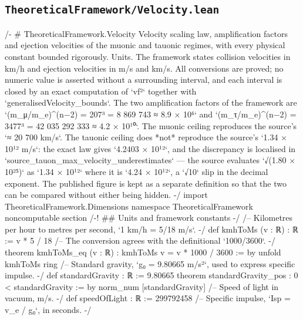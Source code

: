 \documentclass[11pt,a4paper]{article}
\begin{document}
\clearpage


\subsection*{\texttt{TheoreticalFramework/Velocity.lean}}
\vspace{2pt}
{\ttfamily\scriptsize\setlength{\parindent}{0pt}\setlength{\baselineskip}{7.6pt}\setlength{\parskip}{0pt}\raggedright\obeyspaces\obeylines
/-
\# TheoreticalFramework.Velocity
\mbox{}
Velocity scaling law, amplification factors and ejection velocities of the
muonic and tauonic regimes, with every physical constant bounded rigorously.
\mbox{}
Units.  The framework states collision velocities in km/h and ejection
velocities in m/s and km/s.  All conversions are proved; no numeric value is
asserted without a surrounding interval, and each interval is closed by an exact
computation of `vf²` together with `generalisedVelocity\_\allowbreak{}bounds`.
\mbox{}
The two amplification factors of the framework are
`(m\_\allowbreak{}μ/m\_\allowbreak{}e)\textasciicircum{}(n−2) = 207³ = 8 869 743 ≈ 8.9 × 10⁶` and
`(m\_\allowbreak{}τ/m\_\allowbreak{}e)\textasciicircum{}(n−2) = 3477³ = 42 035 292 333 ≈ 4.2 × 10¹⁰`.
\mbox{}
The muonic ceiling reproduces the source's `≈ 20 700 km/s`.  The tauonic ceiling
does *not* reproduce the source's `1.34 × 10¹² m/s`: the exact law gives
`4.2403 × 10¹²`, and the discrepancy is localised in
`source\_\allowbreak{}tauon\_\allowbreak{}max\_\allowbreak{}velocity\_\allowbreak{}underestimates` — the source evaluates
`√(1.80 × 10²⁵)` as `1.34 × 10¹²` where it is `4.24 × 10¹²`, a `√10` slip in the
decimal exponent.  The published figure is kept as a separate definition so that
the two can be compared without either being hidden.
-/
import TheoreticalFramework.Dimensions
\mbox{}
namespace TheoreticalFramework
\mbox{}
noncomputable section
\mbox{}
/-! \#\# Units and framework constants -/
\mbox{}
/-- Kilometres per hour to metres per second, `1 km/h = 5/18 m/s`. -/
def kmhToMs (v : ℝ) : ℝ := v * 5 / 18
\mbox{}
/-- The conversion agrees with the definitional `1000/3600`. -/
theorem kmhToMs\_\allowbreak{}eq (v : ℝ) : kmhToMs v = v * 1000 / 3600 := by
  unfold kmhToMs
  ring
\mbox{}
/-- Standard gravity, `g₀ = 9.80665 m/s²`, used to express specific impulse. -/
def standardGravity : ℝ := 9.80665
\mbox{}
theorem standardGravity\_\allowbreak{}pos : 0 \textless{} standardGravity := by
  norm\_\allowbreak{}num [standardGravity]
\mbox{}
/-- Speed of light in vacuum, m/s. -/
def speedOfLight : ℝ := 299792458
\mbox{}
/-- Specific impulse, `Isp = v\_\allowbreak{}e / g₀`, in seconds. -/
}
\end{document}
